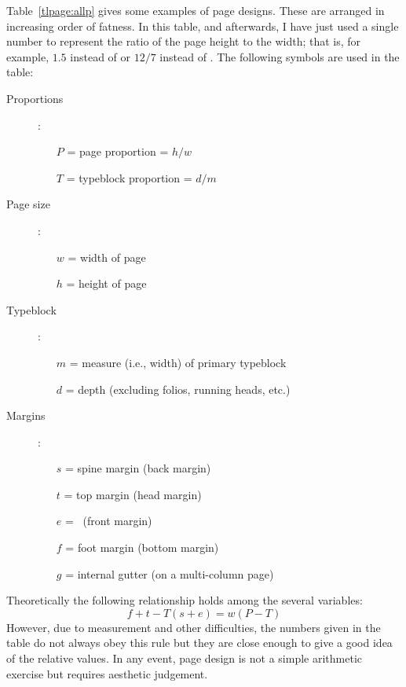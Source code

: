 \documentclass[10pt,letterpaper,extrafontsizes]{memoir}
\begin{document}
  Table~\ref{tlpage:allp} gives some examples of 
page designs. These are arranged in increasing order of
fatness. In this table, and afterwards, I have just used a single number
to represent the ratio of the page height to the width; that is, for example,
$1.5$ instead of  or $12/7$ instead of .
The following symbols are used in the table:
\begin{description}
\item[Proportions]:
  \begin{itemize}
  \item[$P$] = page proportion = $h/w$
  \item[$T$] = typeblock proportion = $d/m$
  \end{itemize}
\item[Page size]:
  \begin{itemize}
  \item[$w$] = width of page
  \item[$h$] = height of page
  \end{itemize}
\item[Typeblock]:
  \begin{itemize}
  \item[$m$] = measure (i.e., width) of primary typeblock
  \item[$d$] = depth (excluding folios, running heads, etc.)
  \end{itemize}
\item[Margins]:
  \begin{itemize}
  \item[$s$] = spine margin (back margin)
  \item[$t$] = top margin (head margin)
  \item[$e$] = \foredge\ (front margin)
  \item[$f$] = foot margin (bottom margin)
  \item[$g$] = internal gutter (on a multi-column page)
  \end{itemize}
\end{description}

    Theoretically the following relationship holds among the several
variables:
\begin{displaymath}
f + t - T(s + e) = w(P - T)
\end{displaymath}
However, due to measurement and other difficulties, the numbers given in 
the table do not always obey this rule but they are close enough to give
a good idea of the relative values. In any event, page design is not a
simple arithmetic exercise but requires aesthetic judgement.
\end{document}
